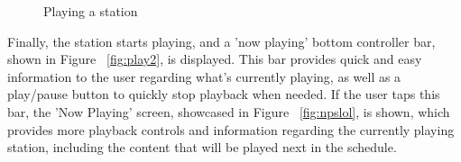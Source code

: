 \begin{figure}[htbp]
	\centering
	 \qquad
	 \qquad
	\caption{Playing a station}
	\label{fig:mfp1}
\end{figure}

Finally, the station starts playing, and a 'now playing' bottom controller bar, shown in Figure ~\ref{fig:play2}, is displayed. This bar provides quick and easy information to the user regarding what's currently playing, as well as a play/pause button to quickly stop playback when needed. If the user taps this bar, the 'Now Playing' screen, showcased in Figure ~\ref{fig:npslol}, is shown, which provides more playback controls and information regarding the currently playing station, including the content that will be played next in the schedule.

